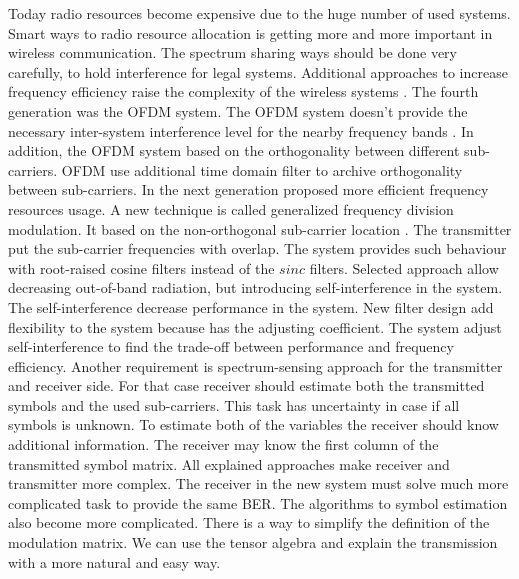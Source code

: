 
Today radio resources become expensive due to the huge number of used systems. Smart ways to radio resource allocation is getting more and more important in wireless communication. The spectrum sharing ways should be done very carefully, to hold interference for legal systems. Additional approaches to increase frequency efficiency raise the complexity of the wireless systems \cite{Book32}. 
The fourth generation was the OFDM system. The OFDM system doesn't provide the necessary inter-system interference level for the nearby frequency bands \cite{Book34}\cite{Book35}. In addition, the OFDM system based on the orthogonality between different sub-carriers.  OFDM use additional time domain filter to archive orthogonality between sub-carriers.  In the next generation proposed more efficient frequency resources usage. A new technique  is called generalized frequency division modulation. It based on the non-orthogonal sub-carrier location \cite{Book34} \cite{Book33}. The transmitter put the sub-carrier frequencies with overlap. The system provides such behaviour with root-raised cosine filters instead of the $sinc$ filters. Selected approach allow decreasing out-of-band radiation, but introducing self-interference in the system. The self-interference decrease performance in the system.  New filter design add flexibility to the system because has the adjusting coefficient. The system adjust self-interference to find the trade-off between performance and frequency efficiency. Another requirement is spectrum-sensing approach for the transmitter and receiver side. For that case receiver should estimate both the transmitted symbols and the used sub-carriers. This task has uncertainty in case if all symbols is unknown. To estimate both of the variables the receiver should know additional information. The receiver may know the first column of the transmitted symbol matrix. All explained approaches make receiver and transmitter more complex. The receiver in the new system must solve much more complicated task to provide the same BER. The algorithms to symbol estimation also become more complicated.   There is a way to simplify the definition of the modulation matrix. We can use the tensor algebra and explain the transmission with a more natural and easy way. 
